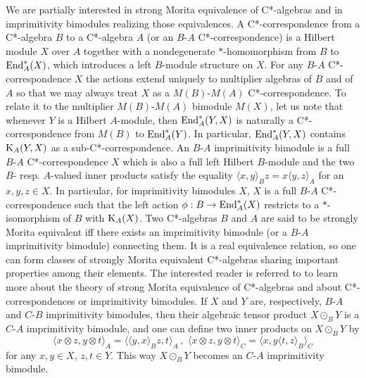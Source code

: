 \documentclass{amsart}
\theoremstyle{definition}
\begin{document}
We are partially interested in strong Morita equivalence of C*-algebras and in imprimitivity bimodules realizing those equivalences. A C*-correspondence from a C*-algebra $B$ to a C*-algebra $A$ (or an $B$-$A$ C*-correspondence) is a Hilbert module $X$ over $A$ together with a nondegenerate $*$-homomorphism from $B$ to ${\rm End}^*_A(X)$, which introduces a left $B$-module structure on $X$. For any $B$-$A$ C*-correspondence $X$ the actions extend uniquely to multiplier algebras of $B$ and of $A$ so that we may always treat $X$ as a $M(B)$-$M(A)$ C*-correspondence. To relate it to the multiplier $M(B)$-$M(A)$ bimodule $M(X)$, let us note that whenever $Y$ is a Hilbert $A$-module, then ${\rm End}^*_A(Y,X)$
is naturally a C*-correspondence from $M(B)$ to ${\rm End}^*_A(Y)$. In particular, ${\rm End}^*_A(Y,X)$ contains ${\rm K}_A(Y,X)$ as a sub-C*-correspondence.
An $B$-$A$ imprimitivity bimodule is a full $B$-$A$ C*-correspondence $X$ which is also a full left Hilbert $B$-module and the two $B$- resp. $A$-valued inner products satisfy the equality $\langle x,y \rangle_B z = x \langle y,z \rangle_A$ for an $x,y,z \in X$. In particular, for imprimitivity bimodules $X$, $X$ is a full $B$-$A$ C*-correspondence such that the left action $\phi: B \to  {\rm End}^*_A(X)$ restricts to a $*$-isomorphism of $B$ with ${\rm K}_A(X)$. 
Two C*-algebras $B$ and $A$ are said to be strongly Morita equivalent iff there exists an imprimitivity bimodule (or a $B$-$A$ imprimitivity bimodule) connecting them. It is a real equivalence relation, so one can form classes of strongly Morita equivalent C*-algebras sharing important properties among their elements. The interested reader is referred to \cite{RW_1998,EchRae_1995,Daws_2010,Daws_2011,BKMS_2024,Delfin_2024} to learn more about the theory of strong Morita equivalence of C*-algebras and about C*-correspondences or imprimitivity bimodules. 
If $X$ and $Y$ are, respectively, $B$-$A$ and $C$-$B$ imprimitivity bimodules, then their algebraic tensor product $X \odot_B Y$ is a $C$-$A$ imprimitivity bimodule, and one can define two inner products on  $X \odot_B Y$ by
\[
\langle x \otimes z, y \otimes t \rangle_A = \langle \langle y,x\rangle_B z, t \rangle_A \, , \,\, 
\langle x \otimes z, y \otimes t \rangle_C = \langle x, y \langle t,z\rangle_B \rangle_C
\]
for any $x,y \in X$, $z,t \in Y$. This way  $X \odot_B Y$ becomes an $C$-$A$ imprimitivity bimodule. 
\end{document}
